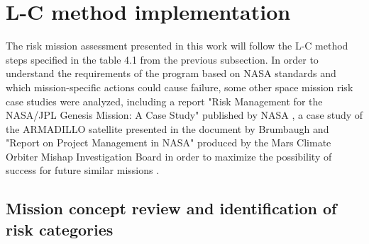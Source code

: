 \section{L-C method implementation}

The risk mission assessment presented in this work will follow the L-C method steps specified in the table 4.1 from the previous subsection. In order to understand the requirements of the program based on NASA standards and which mission-specific actions could cause failure, some other space mission risk case studies were analyzed, including a report "Risk Management for the NASA/JPL Genesis Mission: A Case Study" published by NASA \cite{genesis}, a case study of the ARMADILLO satellite presented in the document by Brumbaugh \cite{Brumbaugh} and "Report on Project Management in NASA" produced by the Mars Climate Orbiter Mishap Investigation Board in order to maximize the possibility of success for future similar missions \cite{mro}.

\subsection{Mission concept review and identification of risk categories}